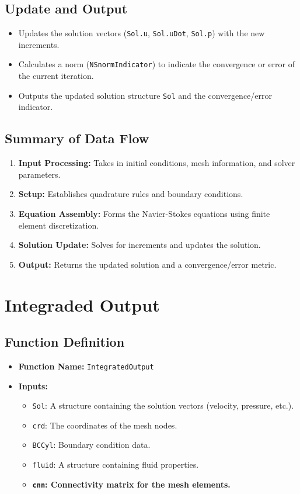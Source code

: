\documentclass[a4paper,12pt]{article} %
\begin{document}
\subsection*{Update and Output}
\begin{itemize}
    \item Updates the solution vectors (\texttt{Sol.u}, \texttt{Sol.uDot}, \texttt{Sol.p}) with the new increments.
    \item Calculates a norm (\texttt{NSnormIndicator}) to indicate the convergence or error of the current iteration.
    \item Outputs the updated solution structure \texttt{Sol} and the convergence/error indicator.
\end{itemize}

\subsection*{Summary of Data Flow}
\begin{enumerate}
    \item \textbf{Input Processing:} Takes in initial conditions, mesh information, and solver parameters.
    \item \textbf{Setup:} Establishes quadrature rules and boundary conditions.
    \item \textbf{Equation Assembly:} Forms the Navier-Stokes equations using finite element discretization.
    \item \textbf{Solution Update:} Solves for increments and updates the solution.
    \item \textbf{Output:} Returns the updated solution and a convergence/error metric.
\end{enumerate}


\section{Integraded Output}

\subsection*{Function Definition}
\begin{itemize}
    \item \textbf{Function Name:} \texttt{IntegratedOutput}
    \item \textbf{Inputs:}
    \begin{itemize}
        \item \texttt{Sol}: A structure containing the solution vectors (velocity, pressure, etc.).
        \item \texttt{crd}: The coordinates of the mesh nodes.
        \item \texttt{BCCyl}: Boundary condition data.
        \item \texttt{fluid}: A structure containing fluid properties.
        \item \textbf{\texttt{cnn}: Connectivity matrix for the mesh elements.}
    \end{itemize}
\end{itemize}
\end{document}
